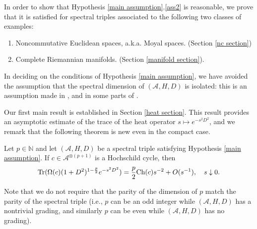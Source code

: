     In order to show that Hypothesis \ref{main assumption}.\eqref{ass2} is reasonable, we prove that it is satisfied for spectral triples associated to the following two classes of examples:
    \begin{enumerate}[{\rm (i)}]
        \item{} Noncommutative Euclidean spaces, a.k.a. Moyal spaces. (Section \ref{nc section})
        \item{} Complete Riemannian manifolds. (Section \ref{manifold section}).
    \end{enumerate}
    
    In deciding on the conditions of Hypothesis \ref{main assumption}, we have avoided the assumption that the spectral dimension of $(\mathcal{A},H,D)$ is isolated: this is an assumption
    made in \cite{higson}, \cite{Connes-Moscovici} and in some parts of \cite{CGRS2}.
    
    Our first main result is established in Section \ref{heat section}. This result provides an asymptotic estimate of the trace of the heat operator $s \mapsto e^{-s^2D^2}$,
    and we remark that the following theorem is new even in the compact case.
    \begin{thm}\label{heat thm} 
        Let $p\in\mathbb{N}$ and let $(\mathcal{A},H,D)$ be a spectral triple satisfying Hypothesis \ref{main assumption}. If $c\in\mathcal{A}^{\otimes (p+1)}$ is a Hochschild cycle, then
        \begin{equation}\label{heat eq}
            {\rm Tr}(\Omega(c)(1+D^2)^{1-\frac{p}{2}}e^{-s^2D^2})=\frac{p}{2}{\rm Ch}(c)s^{-2}+O(s^{-1}),\quad s\downarrow0.
        \end{equation}
    \end{thm}
    
    Note that we do not require that the parity of the dimension of $p$ match the parity of the spectral triple (i.e., $p$ can be an odd integer while $(\mathcal{A},H,D)$ has a nontrivial grading, and similarly
    $p$ can be even while $(\mathcal{A},H,D)$ has no grading).

